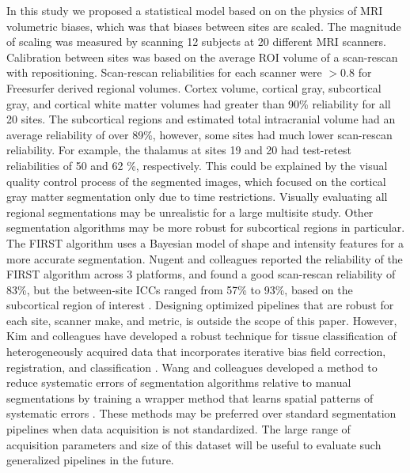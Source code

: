 In this study we proposed a statistical model based on on the physics of MRI volumetric biases, which was that biases between sites are scaled. The magnitude of scaling was measured by scanning 12 subjects at 20 different MRI scanners. Calibration between sites was based on the average ROI volume of a scan-rescan with repositioning. Scan-rescan reliabilities for each scanner were $>0.8$ for Freesurfer derived regional volumes. Cortex volume, cortical gray, subcortical gray, and cortical white matter volumes had greater than 90\% reliability for all 20 sites. The subcortical regions and estimated total intracranial volume had an average reliability of over 89\%, however, some sites had much lower scan-rescan reliability. For example, the thalamus at sites 19 and 20 had test-retest reliabilities of 50 and 62 \%, respectively. This could be explained by the visual quality control process of the segmented images, which focused on the cortical gray matter segmentation only due to time restrictions. Visually evaluating all regional segmentations may be unrealistic for a large multisite study. Other segmentation algorithms may be more robust for subcortical regions in particular. The FIRST algorithm \cite{firstcitation} uses a Bayesian model of shape and intensity features for a more accurate segmentation. Nugent and colleagues reported the reliability of the FIRST algorithm across 3 platforms, and found a good scan-rescan reliability of 83\%, but the between-site ICCs ranged from 57\% to 93\%, based on the subcortical region of interest \cite{firstreliability}. Designing optimized pipelines that are robust for each site, scanner make, and metric, is outside the scope of this paper. However, Kim and colleagues have developed a robust technique for tissue classification of heterogeneously acquired data that incorporates iterative bias field correction, registration, and classification \cite{optimize}. Wang and colleagues developed a method to reduce systematic errors of segmentation algorithms relative to manual segmentations by training a wrapper method that learns spatial patterns of systematic errors \cite{Wang2011}. These methods may be preferred over standard segmentation pipelines when data acquisition is not standardized. The large range of acquisition parameters and size of this dataset will be useful to evaluate such generalized pipelines in the future.